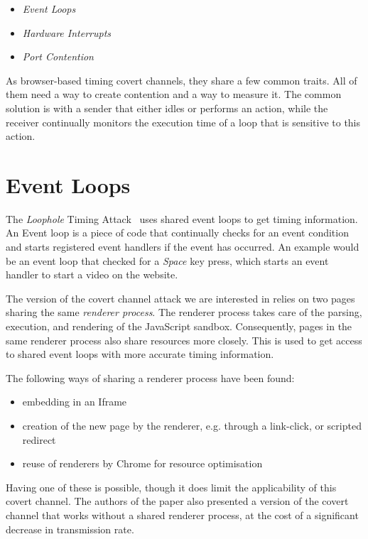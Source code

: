 \documentclass[11pt,
  titlepage=false,
  parskip=half,      %
]{scrreprt}
\begin{document}
\begin{itemize}
    \item \textit{Event Loops}~\cite{vila2017loophole}
    \item \textit{Hardware Interrupts}~\cite{lipp2017practical}
    \item \textit{Port Contention}~\cite{Rokicki2022webport}
\end{itemize}

As browser-based timing covert channels, they share a few common traits.
All of them need a way to create contention and a way to measure it.
The common solution is with a sender that either idles or performs an action,
while the receiver continually monitors the execution time of a loop that is sensitive to this action.

\section{Event Loops}
The \textit{Loophole} Timing Attack~\cite{vila2017loophole} uses shared event loops to get timing information.
An Event loop is a piece of code that continually checks for an event condition
and starts registered event handlers if the event has occurred.
An example would be an event loop that checked for a \textit{Space} key press,
which starts an event handler to start a video on the website.

The version of the covert channel attack we are interested in relies on two pages sharing the same \textit{renderer process}.
The renderer process takes care of the parsing, execution, and rendering of the JavaScript sandbox.
Consequently, pages in the same renderer process also share resources more closely.
This is used to get access to shared event loops with more accurate timing information.

The following ways of sharing a renderer process have been found:

\begin{itemize}
    \item embedding in an Iframe
    \item creation of the new page by the renderer, e.g. through a link-click, or scripted redirect
    \item reuse of renderers by Chrome for resource optimisation
\end{itemize}

Having one of these is possible, though it does limit the applicability of this covert channel.
The authors of the paper also presented a version of the covert channel that works without a shared renderer process,
at the cost of a significant decrease in transmission rate.
\end{document}

